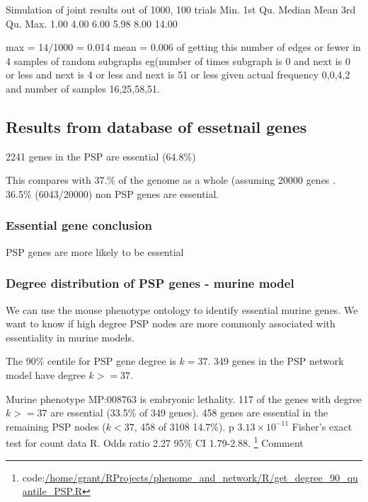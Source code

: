 Simulation of joint results out of 1000, 100 trials
Min. 1st Qu.  Median    Mean 3rd Qu.    Max. 
   1.00    4.00    6.00    5.98    8.00   14.00 
   
   max = 14/1000 = 0.014
   mean = 0.006 of getting this number of edges or fewer in 4 samples of random subgraphs eg(number of times subgraph is 0 and next is 0 or less and next is 4 or less and next is 51 or less given actual frequency 0,0,4,2 and number of samples 16,25,58,51.
   
 


 
 
 \subsection{Results from database of essetnail genes}

2241 genes in the PSP are essential (64.8\%)

This compares with 37.\% of the genome as a whole (assuming 20000 genes . 36.5\% (6043/20000) non PSP genes are essential. 

\subsubsection{Essential gene conclusion}
PSP genes are more likely to be essential


 \subsubsection{Degree distribution of PSP genes - murine model}
 
 We can use the mouse phenotype ontology to identify essential murine genes. 
 We want to know if high degree PSP nodes are more commonly associated with essentiality in murine models. 
 
 The 90\% centile for PSP gene degree is $k=37$. 349 genes in the PSP network model have degree $k>=37$.
 
 Murine phenotype MP:008763 is embryonic lethality. 117 of the genes with degree $k>=37$ are essential (33.5\% of 349 genes). 458 genes are essential in the remaining PSP nodes ($k < 37$, 458 of 3108 14.7\%). p $3.13 \times 10^{-11}$ Fisher's exact test for count data R. Odds ratio 2.27 95\% CI 1.79-2.88. \footnote{code:\url{/home/grant/RProjects/phenome_and_network/R/get_degree_90_quantile_PSP.R}}  Comment 
 
